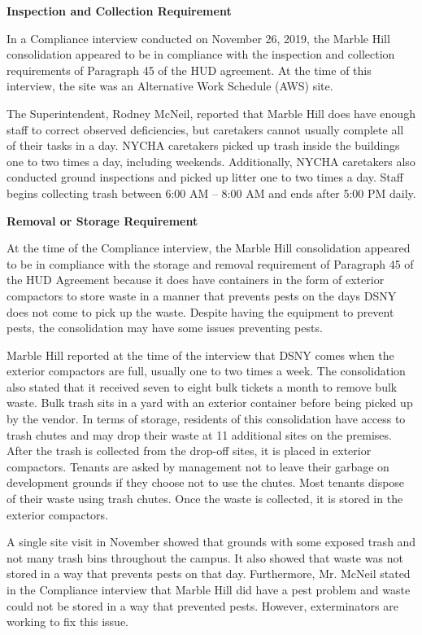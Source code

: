

\textbf{Inspection and Collection Requirement}

In a Compliance interview conducted on November 26, 2019, the Marble Hill consolidation appeared to be in compliance with the inspection and collection requirements of Paragraph 45 of the HUD agreement. At the time of this interview, the site was an Alternative Work Schedule (AWS) site. 

The Superintendent, Rodney McNeil, reported that Marble Hill does have enough staff to correct observed deficiencies, but caretakers cannot usually complete all of their tasks in a day. NYCHA caretakers picked up trash inside the buildings one to two times a day, including weekends. Additionally, NYCHA caretakers also conducted ground inspections and picked up litter one to two times a day. Staff begins collecting trash between 6:00 AM -- 8:00 AM and ends after 5:00 PM daily.

\textbf{Removal or Storage Requirement}

At the time of the Compliance interview, the Marble Hill consolidation appeared to be in compliance with the storage and removal requirement of Paragraph 45 of the HUD Agreement because it does have containers in the form of exterior compactors to store waste in a manner that prevents pests on the days DSNY does not come to pick up the waste. Despite having the equipment to prevent pests, the consolidation may have some issues preventing pests.  

Marble Hill reported at the time of the interview that DSNY comes when the exterior compactors are full, usually one to two times a week. The consolidation also stated that it received seven to eight bulk tickets a month to remove bulk waste. Bulk trash sits in a yard with an exterior container before being picked up by the vendor. In terms of storage, residents of this consolidation have access to trash chutes and may drop their waste at 11 additional sites on the premises. After the trash is collected from the drop-off sites, it is placed in exterior compactors. Tenants are asked by management not to leave their garbage on development grounds if they choose not to use the chutes. Most tenants dispose of their waste using trash chutes. Once the waste is collected, it is stored in the exterior compactors.  

A single site visit in November showed that grounds with some exposed trash and not many trash bins throughout the campus. It also showed that waste was not stored in a way that prevents pests on that day. Furthermore, Mr. McNeil stated in the Compliance interview that Marble Hill did have a pest problem and waste could not be stored in a way that prevented pests. However, exterminators are working to fix this issue.

